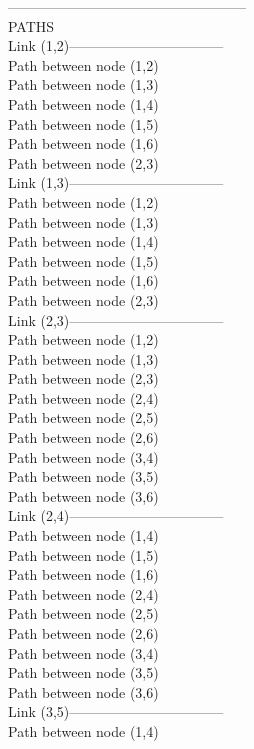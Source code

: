 ---------------------------------------------------\\

PATHS\\
Link (1,2)---------------------------------\\
Path between node (1,2)\\
Path between node (1,3)\\
Path between node (1,4)\\
Path between node (1,5)\\
Path between node (1,6)\\
Path between node (2,3)\\
Link (1,3)---------------------------------\\
Path between node (1,2)\\
Path between node (1,3)\\
Path between node (1,4)\\
Path between node (1,5)\\
Path between node (1,6)\\
Path between node (2,3)\\
Link (2,3)---------------------------------\\
Path between node (1,2)\\
Path between node (1,3)\\
Path between node (2,3)\\
Path between node (2,4)\\
Path between node (2,5)\\
Path between node (2,6)\\
Path between node (3,4)\\
Path between node (3,5)\\
Path between node (3,6)\\
Link (2,4)---------------------------------\\
Path between node (1,4)\\
Path between node (1,5)\\
Path between node (1,6)\\
Path between node (2,4)\\
Path between node (2,5)\\
Path between node (2,6)\\
Path between node (3,4)\\
Path between node (3,5)\\
Path between node (3,6)\\
Link (3,5)---------------------------------\\
Path between node (1,4)\\
